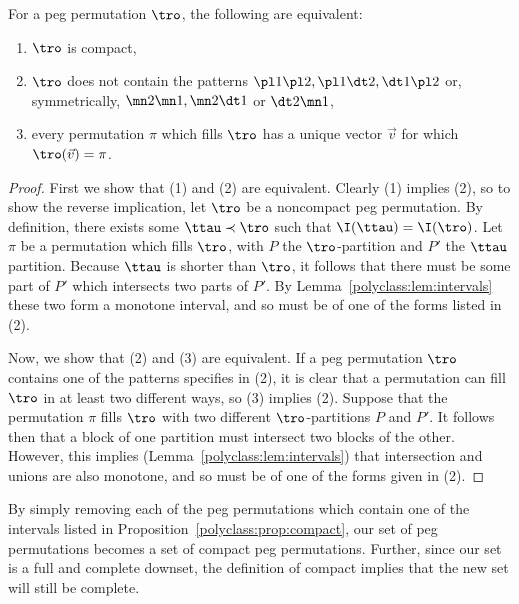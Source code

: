 \documentclass[12pt,twoside]{memoir}
\begin{document}
      \begin{proposition}\label{polyclass:prop:compact}
        For a peg permutation $\tro$, the following are equivalent:
        \begin{enumerate}[1)]
        \item $\tro$ is compact, 
        \item $\tro$ does not contain the patterns $\pl1 \pl2, \pl1 \dt2, \dt1
          \pl2$ or, symmetrically, $\mn2 \mn1, \mn2 \dt1$ or $\dt2 \mn 1$, 
        \item every permutation $\pi$ which fills $\tro$ has a unique vector
          $\vec v$ for which $\tro(\vec v) = \pi$. 
        \end{enumerate}
      \end{proposition}
      \begin{proof}
        First we show that (1) and (2) are equivalent. Clearly (1) implies (2),
        so to show the reverse implication, let $\tro$ be a noncompact peg
        permutation. By definition, there exists some $\ttau \prec \tro$ such that
        $\I(\ttau) = \I(\tro)$. Let $\pi$ be a permutation which fills $\tro$,
        with $P$ the $\tro$-partition and $P'$ the $\ttau$ partition. Because
        $\ttau$ is shorter than $\tro$, it follows that there must be some part
        of $P'$ which intersects two parts of $P'$. By
        Lemma~\ref{polyclass:lem:intervals} these two form a monotone
        interval, and so must be of one of the forms listed in (2). 

        Now, we show that (2) and (3) are equivalent. If a peg permutation
        $\tro$ contains one of the patterns specifies in (2), it is clear that a
        permutation can fill $\tro$ in at least two different ways, so (3)
        implies (2). Suppose that the permutation $\pi$ fills $\tro$ with two
        different $\tro$-partitions $P$ and $P'$. It follows then that
        a block of one partition must intersect two blocks of the other. However,
        this implies (Lemma~\ref{polyclass:lem:intervals}) that intersection
        and unions are also monotone, and so must be of one of the forms given in
        (2). 
      \end{proof}

      By simply removing each of the peg permutations which contain one of the
      intervals listed in Proposition~\ref{polyclass:prop:compact}, our set of
      peg permutations becomes a set of compact peg permutations. Further, since
      our set is a full and complete downset, the definition of compact implies
      that the new set will still be complete. 
\end{document}
